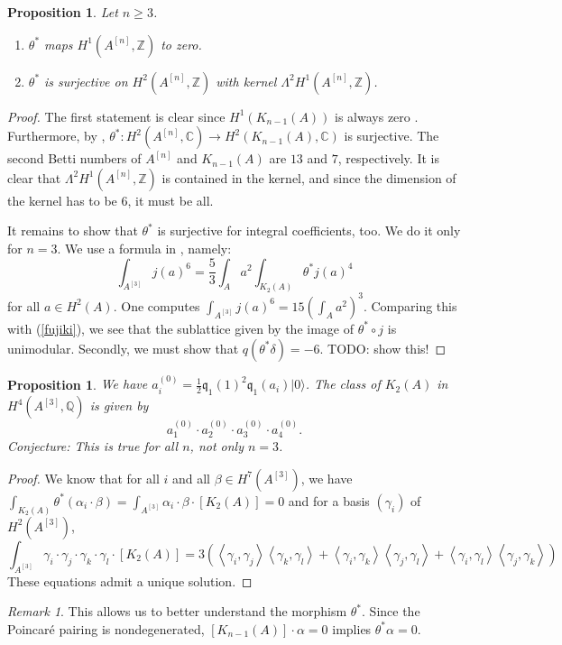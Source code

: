 \documentclass{amsart}
\newcommand{\hilb}[1]{^{[#1]}}
\newcommand{\vac}{|0\rangle}
\newcommand{\pone}{ \mathfrak{p}_{ - 1} }
\newcommand{\kum}[2]{K_{ #2 }( #1 )}
\newcommand{\C}{\mathbb{C}}
\newcommand{\Q}{\mathbb{Q}}
\newcommand{\Z}{\mathbb{Z}}
\newcommand{\kq}{\mathfrak{q}}
\theoremstyle{plain}
\newtheorem{proposition}[theorem]{Proposition}
\theoremstyle{definition}
\theoremstyle{remark}
\newtheorem{remark}[theorem]{Remark}
\begin{document}
\begin{proposition}Let $n\geq 3$.
\begin{enumerate} 
 \item $\theta^*$ maps $H^1(A\hilb{n},\Z)$ to zero.
 \item $\theta^*$ is surjective on $H^2(A\hilb{n},\Z)$ with kernel $\Lambda^2H^1(A\hilb{n},\Z)$.
\end{enumerate}
\end{proposition}
\begin{proof}
The first statement is clear since $H^1(\kum{A}{n-1})$ is always zero \cite[Thm.~3]{Beauville}. Furthermore, by \cite[Sect.~7]{Beauville}, $\theta^{\ast} : H^2(A\hilb{n},\C) \rightarrow H^2(\kum{A}{n-1},\C)$ is surjective. The second Betti numbers of $A\hilb{n}$ and $\kum{A}{n-1}$ are $13$ and $7$, respectively. It is clear that $\Lambda^2H^1(A\hilb{n},\Z)$ is contained in the kernel, and since the dimension of the kernel has to be $6$, it must be all.

It remains to show that $\theta^*$  is surjective for integral coefficients, too. We do it only for $n=3$. We use a formula in \cite[p. 8]{Britze}, namely:
\begin{equation} \int_{A\hilb{3}}j(a)^6 = \frac{5}{3} \int_A a^2 \int_{\kum{A}{2}} \theta^* j(a)^4
\end{equation}
for all $a\in H^2(A)$. One computes $\int_{A\hilb{3}}j(a)^6 = 15 \left(\int_A a^2\right)^3$. Comparing this with (\ref{fujiki}), we see that the sublattice given by the image of $\theta^*\circ j$ is unimodular. Secondly, we must show that $q(\theta^*\delta) = -6$. TODO: show this!
\end{proof}


\begin{proposition}
We have $a_i^{(0)}= \frac{1}{2}\kq_1(1)^2\kq_1(a_i)\vac$. The class of $\kum{A}{2}$ in $H^4(A\hilb{3},\Q)$ is given by
$$
a_1^{(0)}\cdot a_2^{(0)}\cdot a_3^{(0)}\cdot a_4^{(0)}.
$$ 
Conjecture: This is true for all $n$, not only $n=3$.
\end{proposition}
\begin{proof}
We know that for all $i$ and all $\beta\in H^7(A\hilb{3})$, we have $\int_ {\kum{A}{2}}\theta^*(\alpha_i\cdot\beta) = \int_ {A\hilb{3}}\alpha_i\cdot\beta \cdot[\kum{A}{2}]= 0$ and
for a basis $(\gamma_i) $ of  $H^2(A\hilb{3})$,
$$
\int_ {A\hilb{3}}\gamma_i\cdot\gamma_j\cdot\gamma_k\cdot\gamma_l\cdot[\kum{A}{2}] =
 3\left(\left<\gamma_i,\gamma_j\right>\left<\gamma_k,\gamma_l\right>+\left<\gamma_i,\gamma_k\right>\left<\gamma_j,\gamma_l\right>+\left<\gamma_i,\gamma_l\right>\left<\gamma_j,\gamma_k\right>  \right)
$$
These equations admit a unique solution.
\end{proof}
\begin{remark}
This allows us to better understand the morphism $\theta^*$. Since the Poincar\'e pairing is nondegenerated, $[\kum{A}{n-1}]\cdot \alpha=0$ implies $\theta^* \alpha =0$.
\end{remark}
\end{document}
